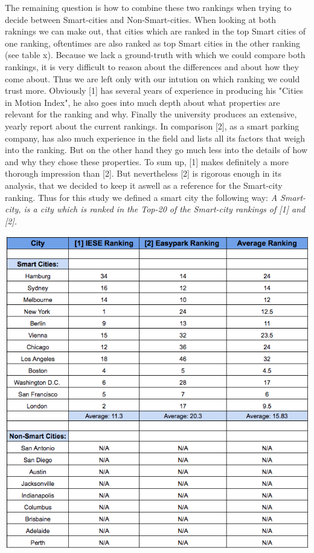 \documentclass[a4paper, 10pt, conference]{ieeeconf}      %
\begin{document}
The remaining question is how to combine these two rankings when trying to decide between Smart-cities and Non-Smart-cities. 
When looking at both raknings we can make out, that cities which are ranked in the top Smart cities of one ranking,
oftentimes are also ranked as top Smart cities in the other ranking (see table x). Because we lack a ground-truth with 
which we could compare both rankings, it is very difficult to reason about the differences and about how they come about. 
Thus we are left only with our intution on which ranking we could trust more. Obviously [1] has several years of experience in 
producing his "Cities in Motion Index", he also goes into much depth about what properties are relevant for the ranking and why.
Finally the university produces an extensive, yearly report about the current rankings. In comparison [2], as a smart parking company, 
has also much experience in the field and lists all its factors that weigh into the ranking. But on the other hand they go much less
into the details of how and why they chose these properties. To sum up, [1] makes definitely a more thorough impression than [2]. 
But nevertheless [2] is rigorous enough in its analysis, that we decided to keep it aswell as a reference for the Smart-city ranking.
Thus for this study we defined a smart city the following way: \newline
\textit{A Smart-city, is a city which is ranked in the Top-20 of the Smart-city rankings of [1] and [2].}

\includegraphics[scale=0.5]{"images/rankings"}
\end{document}
